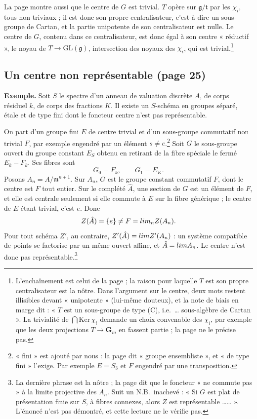 \documentclass[11pt,a4paper]{article}
\begin{document}
La page montre aussi que le centre de $G$ est trivial. $T$ opère sur
$\mathfrak{g}/\mathfrak{t}$ par les $\chi_{i}$, tous non triviaux ; il est
donc son propre centralisateur, c'est-à-dire un sous-groupe de Cartan, et la
partie unipotente de son centralisateur est nulle. Le centre de $G$, contenu
dans ce centralisateur, est donc égal à son centre « réductif », le noyau de
$T \to \mathrm{GL}(\mathfrak{g})$, intersection des noyaux des $\chi_{i}$, qui
est trivial.\footnote{L'enchaînement est celui de la page ; la raison pour
laquelle $T$ est son propre centralisateur est la nôtre. Dans l'argument sur le centre, deux mots restent
illisibles devant « unipotente » (lui-même douteux), et la note de biais en
marge dit : « $T$ est un sous-groupe de type (C), i.e.\ … sous-algèbre de
Cartan ». La trivialité de $\bigcap \mathrm{Ker}\,\chi_{i}$ demande un choix
convenable des $\chi_{i}$, par exemple que les deux projections
$T \to \mathbf{G}_{m}$ en fassent partie ; la page ne le précise pas.}

\subsection*{Un centre non représentable (page 25)}

\textbf{Exemple.} Soit $S$ le spectre d'un anneau de valuation discrète $A$,
de corps résiduel $k$, de corps des fractions $K$. Il existe un $S$-schéma en
groupes séparé, étale et de type fini dont le foncteur centre n'est pas
représentable.

On part d'un groupe fini $E$ de centre trivial et d'un sous-groupe
commutatif non trivial $F$, par exemple engendré par un élément $s \neq
e$.\footnote{« fini » est ajouté par nous : la page dit « groupe
ensembliste », et « de type fini » l'exige. Par exemple $E = S_{3}$ et
$F$ engendré par une transposition.} Soit $G$ le sous-groupe ouvert du groupe
constant $E_{S}$ obtenu en retirant de la fibre spéciale le fermé
$E_{k} - F_{k}$. Ses fibres sont
\[
  G_{0} = F_{k}, \qquad G_{1} = E_{K} .
\]
Posons $A_{n} = A/\mathfrak{m}^{n+1}$. Sur $A_{n}$, $G$ est le groupe constant
commutatif $F$, dont le centre est $F$ tout entier. Sur le complété
$\hat A$, une section de $G$ est un élément de $F$, et elle est centrale
seulement si elle commute à $E$ sur la fibre générique ; le centre de $E$ étant
trivial, c'est $e$. Donc
\[
  Z(\hat A) = \{e\} \neq F = \varprojlim_{n} Z(A_{n}) .
\]
Pour tout schéma $Z'$, au contraire, $Z'(\hat A) = \varprojlim Z'(A_{n})$ : un
système compatible de points se factorise par un même ouvert affine, et
$\hat A = \varprojlim A_{n}$. Le centre n'est donc pas
représentable.\footnote{La dernière phrase est la nôtre ; la page dit que le
foncteur « ne commute pas » à la limite projective des $A_{n}$. Suit un
N.B.\ inachevé : « Si $G$ est plat de présentation finie sur $S$, à fibres
connexes, alors $Z$ est représentable …… ». L'énoncé n'est pas démontré, et
cette lecture ne le vérifie pas.}
\end{document}
